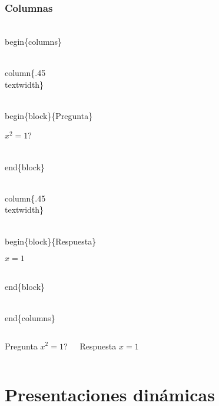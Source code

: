 \documentclass[11pt]{beamer}
\begin{document}
\begin{frame}
\frametitle{Columnas}


\begin{block}{}
\begin{semiverbatim}\scriptsize
\\begin\{columns\}

\\column\{.45\\textwidth\}

\\begin\{block\}\{Pregunta\}

$x^2=1$?

\\end\{block\}

\\column\{.45\\textwidth\}

\\begin\{block\}\{Respuesta\}

$x=1$

\\end\{block\}

\\end\{columns\}
\end{semiverbatim}
\end{block}

\begin{columns}
\begin{block}{Pregunta}
$x^2=1$?
\end{block}
\begin{block}{Respuesta}
$x=1$
\end{block}
\end{columns}
\end{frame}


\section{Presentaciones din\'amicas}
\end{document}
